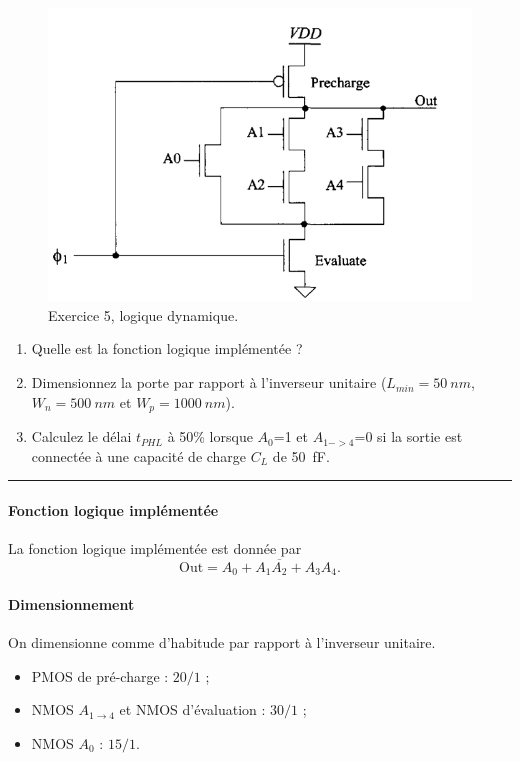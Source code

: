 \documentclass[frenchb,DIV=14]{scrartcl}
\begin{document}
\begin{figure}[]
   \centering
   \includegraphics[width=14cm]{figures/fig9-2.png}
   \caption{Exercice 5, logique dynamique.}
   \label{fig9-2}
\end{figure}

\begin{enumerate}
	\item Quelle est la fonction logique implémentée ?
	\item Dimensionnez la porte par rapport à l'inverseur unitaire ($L_{min}=\SI{50}{nm}$,
	$W_n=\SI{500}{nm}$ et $W_p=\SI{1000}{nm}$).
	\item Calculez le délai $t_{PHL}$ à 50\% lorsque $A_0$=1 et $A_{1->4}$=0 si la sortie
	est connectée à une capacité de charge $C_L$ de \SI{50}{\femto\farad}.
\end{enumerate}

\hspace{1cm}\hrule\hspace{1cm}

\paragraph{Fonction logique implémentée}
La fonction logique implémentée est donnée par
\[ \text{Out} = \overline{A_0 + A_1A_2 + A_3A_4}.\]

\paragraph{Dimensionnement}
On dimensionne comme d'habitude par rapport à l'inverseur unitaire.
\begin{itemize}
	\item PMOS de pré-charge : $20/1$ ;
	\item NMOS $A_{1\to4}$ et NMOS d'évaluation : $30/1$ ;
	\item NMOS $A_0$ : $15/1$. 
\end{itemize}
\end{document}
